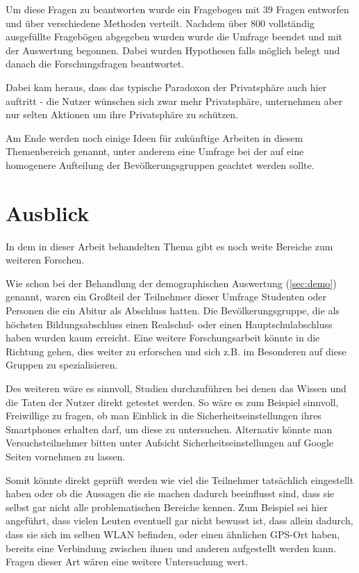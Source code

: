 Um diese Fragen zu beantworten wurde ein Fragebogen mit 39 Fragen entworfen und über verschiedene Methoden verteilt. Nachdem über 800 vollständig ausgefüllte Fragebögen abgegeben wurden wurde die Umfrage beendet und mit der Auswertung begonnen. Dabei wurden Hypothesen falls möglich belegt und danach die Forschungsfragen beantwortet. 

Dabei kam heraus, dass das typische Paradoxon der Privatsphäre auch hier auftritt - die Nutzer wünschen sich zwar mehr Privatsphäre, unternehmen aber nur selten Aktionen um ihre Privatsphäre zu schützen.

Am Ende werden noch einige Ideen für zukünftige Arbeiten in diesem Themenbereich genannt, unter anderem eine Umfrage bei der auf eine homogenere Aufteilung der Bevölkerungsgruppen geachtet werden sollte.

\section{Ausblick}
In dem in dieser Arbeit behandelten Thema gibt es noch weite Bereiche zum weiteren Forschen.

Wie schon bei der Behandlung der demographischen Auswertung (\ref{sec:demo}) genannt, waren ein Großteil der Teilnehmer dieser Umfrage Studenten oder Personen die ein Abitur als Abschluss hatten. Die Bevölkerungsgruppe, die als höchsten Bildungsabschluss einen Realschul- oder einen Hauptschulabschluss haben wurden kaum erreicht. Eine weitere Forschungsarbeit könnte in die Richtung gehen, dies weiter zu erforschen und sich z.B. im Besonderen auf diese Gruppen zu spezialisieren.

Des weiteren wäre es sinnvoll, Studien durchzuführen bei denen das Wissen und die Taten der Nutzer direkt getestet werden. So wäre es zum Beispiel sinnvoll, Freiwillige zu fragen, ob man Einblick in die Sicherheitseinstellungen ihres Smartphones erhalten darf, um diese zu untersuchen. Alternativ könnte man Versuchsteilnehmer bitten unter Aufsicht Sicherheitseinstellungen auf Google Seiten vornehmen zu lassen.

Somit könnte direkt geprüft werden wie viel die Teilnehmer tatsächlich eingestellt haben oder ob die Aussagen die sie machen dadurch beeinflusst sind, dass sie selbst gar nicht alle problematischen Bereiche kennen. Zum Beispiel sei hier angeführt, dass vielen Leuten eventuell gar nicht bewusst ist, dass allein dadurch, dass sie sich im selben WLAN befinden, oder einen ähnlichen GPS-Ort haben, bereits eine Verbindung zwischen ihnen und anderen aufgestellt werden kann. Fragen dieser Art wären eine weitere Untersuchung wert.

